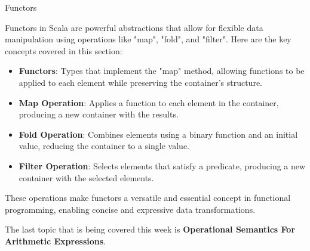\begin{notes}{Functors}
    \begin{highlight}
    
        Functors in Scala are powerful abstractions that allow for flexible data manipulation using operations like "map", "fold", and "filter". Here are the key concepts covered in this section:
    
        \begin{itemize}
            \item \textbf{Functors}: Types that implement the "map" method, allowing functions to be applied to each element while preserving the container's structure.
            \item \textbf{Map Operation}: Applies a function to each element in the container, producing a new container with the results.
            \item \textbf{Fold Operation}: Combines elements using a binary function and an initial value, reducing the container to a single value.
            \item \textbf{Filter Operation}: Selects elements that satisfy a predicate, producing a new container with the selected elements.
        \end{itemize}
        
        These operations make functors a versatile and essential concept in functional programming, enabling concise and expressive data transformations.
    
    \end{highlight}
\end{notes}

The last topic that is being covered this week is \textbf{Operational Semantics For Arithmetic Expressions}.

